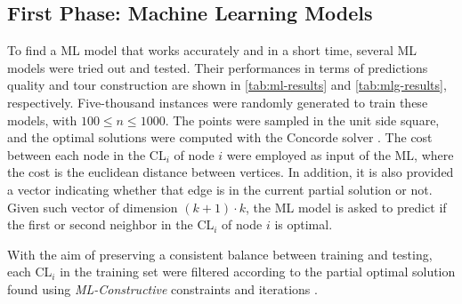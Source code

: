 \documentclass{article}
\begin{document}
\subsection{First Phase: Machine Learning Models}
To find a ML model that works accurately and in a short time, several ML models were tried out and tested.
Their performances in terms of predictions quality and tour construction are shown in \autoref{tab:ml-results} and \ref{tab:mlg-results}, respectively.
Five-thousand instances were randomly generated to train these models, with $100 \leq n \leq 1000$. 
The points were sampled in the unit side square, and the optimal solutions were computed with the Concorde solver \cite{applegate}.
The cost between each node in the CL$_i$ of node $i$ were employed as input of the ML, where the cost is the euclidean distance between vertices.
In addition, it is also provided a vector indicating whether that edge is in the current partial solution or not. 
Given such vector of dimension $(k + 1) \cdot k$, the ML model is asked to predict if the first or second neighbor in the CL$_i$ of node $i$ is optimal.

With the aim of preserving a consistent balance between training and testing, each CL$_i$ in the training set were filtered according to the partial optimal solution found using \emph{ML-Constructive} constraints and iterations \cite{mele:gambardella:montemanni}.
\end{document}
